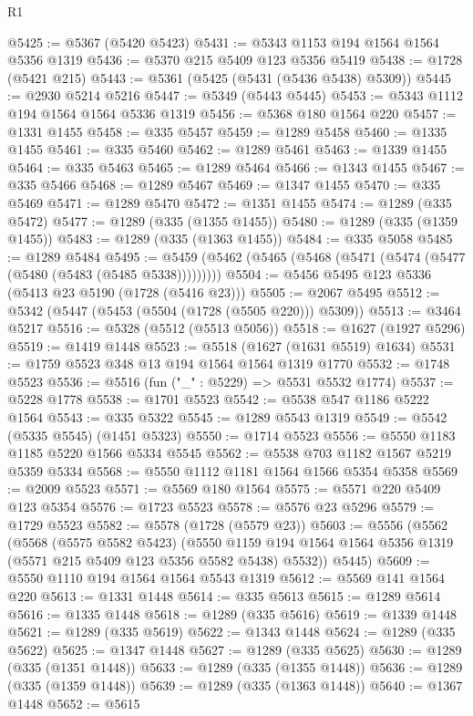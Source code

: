 \begin{lexlean}{R1}
\begin{coremodule}
@5425 := @5367 (@5420 @5423)
@5431 := @5343 @1153 @194 @1564 @1564 @5356 @1319
@5436 := @5370 @215 @5409 @123 @5356 @5419
@5438 := @1728 (@5421 @215)
@5443 := @5361 (@5425 (@5431 (@5436 @5438) @5309))
@5445 := @2930 @5214 @5216
@5447 := @5349 (@5443 @5445)
@5453 := @5343 @1112 @194 @1564 @1564 @5336 @1319
@5456 := @5368 @180 @1564 @220
@5457 := @1331 @1455
@5458 := @335 @5457
@5459 := @1289 @5458
@5460 := @1335 @1455
@5461 := @335 @5460
@5462 := @1289 @5461
@5463 := @1339 @1455
@5464 := @335 @5463
@5465 := @1289 @5464
@5466 := @1343 @1455
@5467 := @335 @5466
@5468 := @1289 @5467
@5469 := @1347 @1455
@5470 := @335 @5469
@5471 := @1289 @5470
@5472 := @1351 @1455
@5474 := @1289 (@335 @5472)
@5477 := @1289 (@335 (@1355 @1455))
@5480 := @1289 (@335 (@1359 @1455))
@5483 := @1289 (@335 (@1363 @1455))
@5484 := @335 @5058
@5485 := @1289 @5484
@5495 := @5459 (@5462 (@5465 (@5468 (@5471 (@5474 (@5477 (@5480 (@5483 (@5485 @5338)))))))))
@5504 := @5456 @5495 @123 @5336 (@5413 @23 @5190 (@1728 (@5416 @23)))
@5505 := @2067 @5495
@5512 := @5342 (@5447 (@5453 (@5504 (@1728 (@5505 @220))) @5309))
@5513 := @3464 @5217
@5516 := @5328 (@5512 (@5513 @5056))
@5518 := @1627 (@1927 @5296)
@5519 := @1419 @1448
@5523 := @5518 (@1627 (@1631 @5519) @1634)
@5531 := @1759 @5523 @348 @13 @194 @1564 @1564 @1319 @1770
@5532 := @1748 @5523
@5536 := @5516 (fun ("_" : @5229) => @5531 @5532 @1774)
@5537 := @5228 @1778
@5538 := @1701 @5523
@5542 := @5538 @547 @1186 @5222 @1564
@5543 := @335 @5322
@5545 := @1289 @5543 @1319
@5549 := @5542 (@5335 @5545) (@1451 @5323)
@5550 := @1714 @5523
@5556 := @5550 @1183 @1185 @5220 @1566 @5334 @5545
@5562 := @5538 @703 @1182 @1567 @5219 @5359 @5334
@5568 := @5550 @1112 @1181 @1564 @1566 @5354 @5358
@5569 := @2009 @5523
@5571 := @5569 @180 @1564
@5575 := @5571 @220 @5409 @123 @5354
@5576 := @1723 @5523
@5578 := @5576 @23 @5296
@5579 := @1729 @5523
@5582 := @5578 (@1728 (@5579 @23))
@5603 := @5556
    (@5562
      (@5568
        (@5575 @5582 @5423)
        (@5550 @1159 @194 @1564 @1564 @5356 @1319 (@5571 @215 @5409 @123 @5356 @5582 @5438) @5532))
      @5445)
@5609 := @5550 @1110 @194 @1564 @1564 @5543 @1319
@5612 := @5569 @141 @1564 @220
@5613 := @1331 @1448
@5614 := @335 @5613
@5615 := @1289 @5614
@5616 := @1335 @1448
@5618 := @1289 (@335 @5616)
@5619 := @1339 @1448
@5621 := @1289 (@335 @5619)
@5622 := @1343 @1448
@5624 := @1289 (@335 @5622)
@5625 := @1347 @1448
@5627 := @1289 (@335 @5625)
@5630 := @1289 (@335 (@1351 @1448))
@5633 := @1289 (@335 (@1355 @1448))
@5636 := @1289 (@335 (@1359 @1448))
@5639 := @1289 (@335 (@1363 @1448))
@5640 := @1367 @1448
@5652 := @5615

\end{coremodule}
\end{lexlean}
